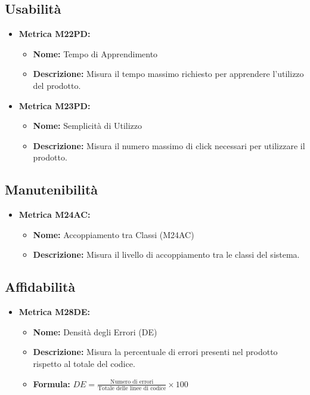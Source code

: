 \subsection{Usabilità}
\begin{itemize}
    \item \textbf{Metrica M22PD:}
          \begin{itemize}
              \item \textbf{Nome:} Tempo di Apprendimento
              \item \textbf{Descrizione:} Misura il tempo massimo richiesto per apprendere l’utilizzo del prodotto.
          \end{itemize}

    \item \textbf{Metrica M23PD:}
          \begin{itemize}
              \item \textbf{Nome:} Semplicità di Utilizzo
              \item \textbf{Descrizione:} Misura il numero massimo di click necessari per utilizzare il prodotto.
          \end{itemize}
\end{itemize}

\subsection{Manutenibilità}
\begin{itemize}
    \item \textbf{Metrica M24AC:}
          \begin{itemize}
              \item \textbf{Nome:} Accoppiamento tra Classi (M24AC)
              \item \textbf{Descrizione:} Misura il livello di accoppiamento tra le classi del sistema.
          \end{itemize}
\end{itemize}


\subsection{Affidabilità}
\begin{itemize}
    \item \textbf{Metrica M28DE:}
          \begin{itemize}
              \item \textbf{Nome:} Densità degli Errori (DE)
              \item \textbf{Descrizione:} Misura la percentuale di errori presenti nel prodotto rispetto al totale del codice.
              \item \textbf{Formula:} $DE = \frac{\text{Numero di errori}}{\text{Totale delle linee di codice}} \times 100$
          \end{itemize}
\end{itemize}

